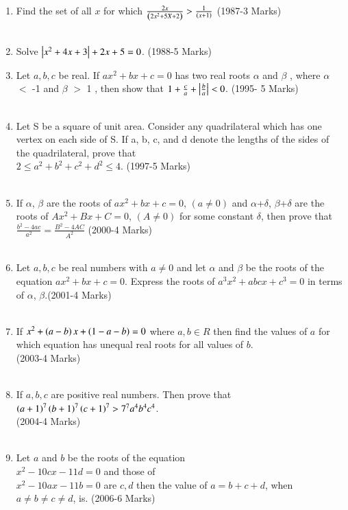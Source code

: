 \documentclass[journal,12pt,twocolumn]{IEEEtran}
\theoremstyle{remark}
\begin{document}
\begin{enumerate}[start=13]
 \item Find the set of all $x$ for which $\frac{2x}{\left(2x^2+5X+2\right)}>\frac{1}{\left(x+1\right)}$ \hfill{(1987-3 Marks)}\\\\
 \item Solve $\left\vert x^2+4x+3\right\vert+2x+5=0$.
 \hfill{(1988-5 Marks)}\\
 \item Let $a,b,c$ be real. If $ax^2+bx+c=0$ has two real roots $\alpha$ and $\beta$ , where $\alpha$ $<$ -1 and $\beta$ $>$ 1 , then show that $1+\frac{c}{a}+\left\vert\frac{b}{a}\right\vert<0$.
 \hfill{(1995- 5 Marks)}\\\\
 \item Let S be a square of unit area. Consider any quadrilateral which has one vertex on each side of S. If a, b, c, and d denote the lengths of the sides of the quadrilateral, prove that \\$2 \leq a^2+b^2+c^2+d^2 \leq 4$. \hfill{(1997-5 Marks)}\\\\
 
 \item If $\alpha$, $\beta$ are the roots of $ax^2+bx+c=0$, $(a\neq 0)$ and $\alpha$+$\delta$, $\beta$+$\delta$ are the roots of $Ax^2+Bx+C=0$, $(A\neq 0)$ for some constant $\delta$, then prove that $\frac{b^2-4ac}{a^2}=\frac{B^2-4AC}{A^2}$ \hfill{(2000-4 Marks)} \\\\

 \item Let $a, b,c $ be real numbers with $a\neq0$ and let $\alpha$ and $\beta$ be the roots of the equation $ax^2+bx+c=0$. Express the roots of $a^3x^2+abcx+c^3=0$ in terms of $\alpha$, $\beta$.\hfill{(2001-4 Marks)}\\\\
\item If $x^2+\left(a-b\right)x+\left(1-a-b\right)=0$ where $a, b\in R$ then find the values of $a$ for which equation has unequal real roots for all values of $b$.\\
\hfill{(2003-4 Marks)}\\\\
\item If $a, b, c$ are positive real numbers. Then prove that $\left(a+1\right)^7\left(b+1\right)^7\left(c+1\right)^7 > 7^7a^4b^4c^4$.\\ \hfill{(2004-4 Marks)}\\\\
\item Let $a$ and $b$ be the roots of the equation \\$x^2-10cx-11d=0$ and those of \\$x^2-10ax-11b=0$ are $c,d $ then the value of $a=b+c+d$, when $a\neq b\neq c\neq d$, is. \hfill{(2006-6 Marks)}

 
 


\end{enumerate}
\bigskip

\renewcommand{\thefigure}{\theenumi}
\renewcommand{\thetable}{\theenumi}
\end{document}
